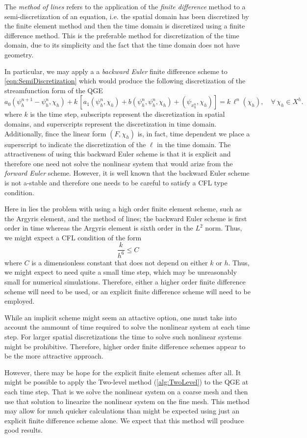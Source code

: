The \emph{method of lines} refers to the application of the \emph{finite
difference} method to a semi-discretization of an equation, i.e. the spatial
domain has been discretized by the finite element method and then the time
domain is discretized using a finite difference method. This is the preferable
method for discretization of the time domain, due to its simplicity and the fact
that the time domain does not have geometry.

In particular, we may apply a a \emph{backward Euler} finite difference scheme
to \eqref{eqn:SemiDiscretization} which would produce the following
discretization of the streamfunction form of the QGE
\begin{equation}
  a_0(\psi_h^{n+1} - \psi_h^n, \chi_h) + k\, \left[a_1(\psi_h^n,\chi_h) + b(\psi_h^n,\psi_h^n,\chi_h)
      + (\psi_x_h^n,\chi_h)\right] = k\, \ell^n(\chi_h),\quad \forall \, \chi_h \in X^h.
  \label{eqn:BEQGE}
\end{equation}
where $k$ is the time step, subscripts represent the discretization in spatial
domains, and superscripts represent the discretization in time domain.
Additionally, fince the linear form $(F,\chi_h)$ is, in fact, time dependent
we place a superscript to indicate the discretization of the $\ell$ in the time
domain.  The attractiveness of using this backward Euler scheme is that it is
explicit and therefore one need not solve the nonlinear system that would arize
from the \emph{forward Euler} scheme. However, it is well known that the
backward Euler scheme is not a-stable and therefore one needs to be careful to
satisfy a CFL type condition.

Here in lies the problem with using a high order finite element scheme, such as
the Argyris element, and the method of lines; the backward Euler scheme is first
order in time whereas the Argyris element is sixth order in the $L^2$ norm.
Thus, we might expect a CFL condition of the form
\begin{equation*}
  \frac{k}{h^6} \le C
\end{equation*}
where $C$ is a dimensionless constant that does not depend on either $k$ or $h$.
Thus, we might expect to need quite a small time step, which may be unreasonably
small for numerical simulations.  Therefore, either a higher order finite
difference scheme will need to be used, or an explicit finite difference scheme
will need to be employed.

While an implicit scheme might seem an attactive option, one must take into
account the ammount of time required to solve the nonlinear system at each time
step. For larger spatial discretizations the time to solve such nonlinear
systems might be prohibitive. Therefore, higher order finite difference schemes
appear to be the more attractive approach.

However, there may be hope for the explicit finite element schemes after all. It
might be possible to apply the Two-level method (\autoref{alg:TwoLevel}) to the
QGE at each time step. That is we solve the nonlinear system on a coarse mesh
and then use that solution to linearize the nonlinear system on the fine mesh.
This method may allow for much quicker calculations than might be expected using
just an explicit finite difference scheme alone. We expect that this method will
produce good results.
